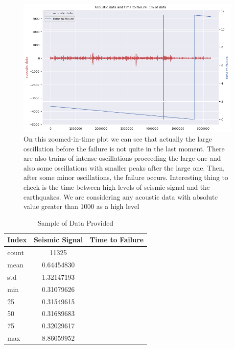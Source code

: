 \documentclass[]{llncs}
\begin{document}
\begin{figure}
	\centering
	\includegraphics[width=0.7\linewidth]{../GPUProject/zoomedInTimePlot}
	\caption{On this zoomed-in-time plot we can see that actually the large oscillation before the failure is not quite in the last moment. There are also trains of intense oscillations proceeding the large one and also some oscillations with smaller peaks after the large one. Then, after some minor oscillations, the failure occurs. Interesting thing to check is the time between high levels of seismic signal and the earthquakes. We are considering any acoustic data with absolute value greater than 1000 as a high level}
	\label{fig:zoomedintimeplot}
\end{figure}
\begin{table}[h!]
	\begin{center}
		\caption{Sample of Data Provided}
		\label{tab:table1}
		\begin{tabular}{l|c|r} %
			\textbf{Index} & \textbf{Seismic Signal} & \textbf{Time to Failure}\\
			\hline
			count & 11325 \\ 
			mean & 0.64454830 \\ 
			std & 1.32147193 \\ 
			min & 0.31079626 \\ 
			25 & 0.31549615 \\ 
			50 & 0.31689683 \\ 
			75 & 0.32029617 \\ 
			max & 8.86059952 \\ 
		\end{tabular}
	\end{center}
\end{table}
\begin{tabular}{|c|c|}
	
\end{tabular} 
\end{document}
